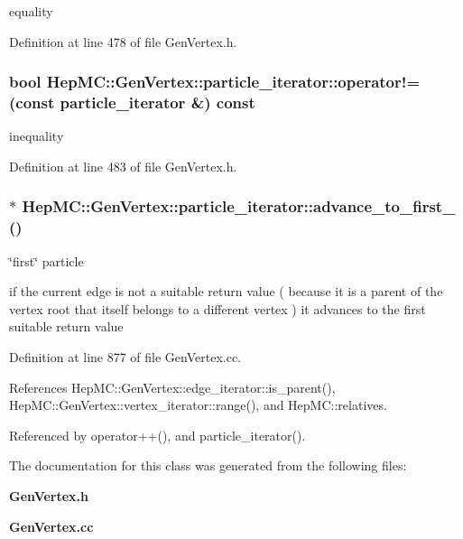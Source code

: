 equality 



Definition at line 478 of file Gen\-Vertex.h.
\subsubsection{\setlength{\rightskip}{0pt plus 5cm}bool Hep\-MC::Gen\-Vertex::particle\_\-iterator::operator!= (const {\bf particle\_\-iterator} \&) const\hspace{0.3cm}{\tt  [inline]}}\label{classHepMC_1_1GenVertex_1_1particle__iterator_3bf3fe5154ebc106c5fb3faa4eee4a06}


inequality 



Definition at line 483 of file Gen\-Vertex.h.
\subsubsection{ $\ast$ Hep\-MC::Gen\-Vertex::particle\_\-iterator::advance\_\-to\_\-first\_\- ()\hspace{0.3cm}{\tt  [protected]}}\label{classHepMC_1_1GenVertex_1_1particle__iterator_9795742185a5a683ca647aedd52cd5eb}


\char`\"{}first\char`\"{} particle 



if the current edge is not a suitable return value ( because it is a parent of the vertex root that itself belongs to a different vertex ) it advances to the first suitable return value 

Definition at line 877 of file Gen\-Vertex.cc.

References Hep\-MC::Gen\-Vertex::edge\_\-iterator::is\_\-parent(), Hep\-MC::Gen\-Vertex::vertex\_\-iterator::range(), and Hep\-MC::relatives.

Referenced by operator++(), and particle\_\-iterator().

The documentation for this class was generated from the following files:\begin{CompactItemize}
\item 
{\bf Gen\-Vertex.h}\item 
{\bf Gen\-Vertex.cc}\end{CompactItemize}
